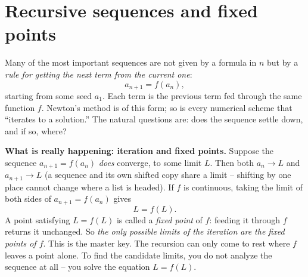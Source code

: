 \section{Recursive sequences and fixed points}
\label{ch28:recursion}

Many of the most important sequences are not given by a formula in $n$ but by a
\emph{rule for getting the next term from the current one}:
\[
  a_{n+1} = f(a_n),
\]
starting from some seed $a_1$. Each term is the previous term fed through the
same function $f$. Newton's method is of this form; so is every numerical scheme
that ``iterates to a solution.'' The natural questions are: does the sequence
settle down, and if so, where?

\begin{happeningbox}
\textbf{What is really happening: iteration and fixed points.} Suppose the
sequence $a_{n+1} = f(a_n)$ \emph{does} converge, to some limit $L$. Then both
$a_n \to L$ and $a_{n+1} \to L$ (a sequence and its own shifted copy share a
limit -- shifting by one place cannot change where a list is headed). If $f$ is
continuous, taking the limit of both sides of $a_{n+1} = f(a_n)$ gives
\[
  L = f(L).
\]
A point satisfying $L = f(L)$ is called a \emph{fixed point} of $f$: feeding it
through $f$ returns it unchanged. So \emph{the only possible limits of the
iteration are the fixed points of $f$}. This is the master key. The recursion can
only come to rest where $f$ leaves a point alone. To find the candidate limits,
you do not analyze the sequence at all -- you solve the equation $L = f(L)$.
\end{happeningbox}

